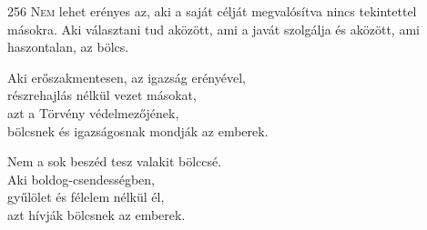 
\begin{firstdhpverse}[-10pt]{256}
\lettrine{N}{em} {\LettrineTextFont lehet erényes az, aki a saját célját}\newline
megvalósítva nincs tekintettel másokra.\newline
Aki választani tud aközött,\newline
ami a javát szolgálja\newline
és aközött, ami haszontalan, az bölcs.
\end{firstdhpverse}

\begin{dhpverse}

 Aki erőszakmentesen, az igazság erényével,\\
részrehajlás nélkül vezet másokat,\\
azt a Törvény védelmezőjének,\\
bölcsnek és igazságosnak mondják az emberek.

 Nem a sok beszéd tesz valakit bölccsé.\\
Aki boldog-csendességben,\\
gyűlölet és félelem nélkül él,\\
azt hívják bölcsnek az emberek.

\end{dhpverse}
\newpage
